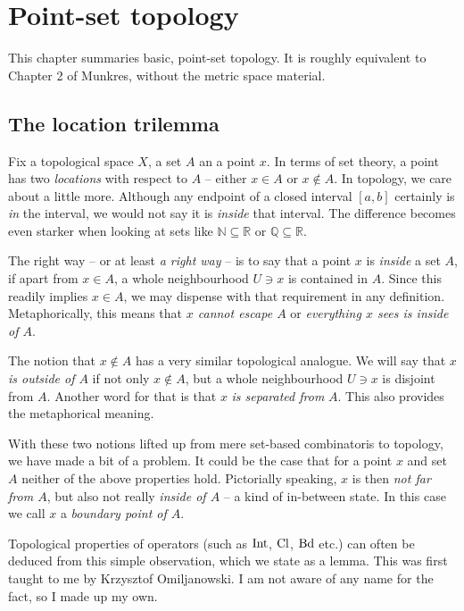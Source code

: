 \chapter{Point-set topology}

This chapter summaries basic, point-set topology. It is roughly equivalent to Chapter 2 of Munkres, without the metric space material.

\section{The location trilemma}

Fix a topological space $X$, a set $A$ an a point $x$. In terms of set theory, a point has two \emph{locations} with respect to $A$ -- either $x \in A$ or $x \not\in A$. In topology, we care about a little more. Although any endpoint of a closed interval $[a,b]$ certainly is \emph{in} the interval, we would not say it is \emph{inside} that interval. The difference becomes even starker when looking at sets like $\mathbb{N} \subseteq \mathbb{R}$ or $\mathbb{Q} \subseteq \mathbb{R}$.

The right way -- or at least \emph{a right way} -- is to say that a point $x$ is \emph{inside} a set $A$, if apart from $x \in A$, a whole neighbourhood $U \ni x$ is contained in $A$. Since this readily implies $x \in A$, we may dispense with that requirement in any definition. Metaphorically, this means that \emph{$x$ cannot escape $A$} or \emph{everything $x$ sees is inside of $A$}. 

The notion that $x \not\in A$ has a very similar topological analogue. We will say that \emph{$x$ is outside of $A$} if not only $x \not\in A$, but a whole neighbourhood $ U \ni x$ is disjoint from $A$. Another word for that is that $x$ \emph{is separated from} $A$. This also provides the metaphorical meaning.

With these two notions lifted up from mere set-based combinatoris to topology, we have made a bit of a problem. It could be the case that for a point $x$ and set $A$ neither of the above properties hold. Pictorially speaking, $x$ is then \emph{not far from $A$}, but also not really \emph{inside of $A$} -- a kind of in-between state. In this case we call $x$ a \emph{boundary point of $A$}.

Topological properties of operators (such as $\operatorname{Int}$, $\operatorname{Cl}$, $\operatorname{Bd}$ etc.) can often be deduced from this simple observation, which we state as a lemma. This was first taught to me by Krzysztof Omiljanowski. I am not aware of any name for the fact, so I made up my own.

